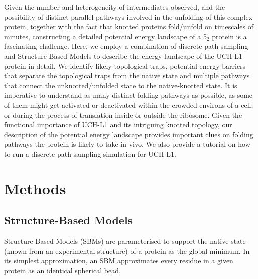 \documentclass[journal=jacsat]{achemso}
\begin{document}
Given the number and heterogeneity of intermediates observed, and the possibility of distinct parallel pathways involved in the unfolding of this complex protein, together with the fact that knotted proteins fold/unfold on timescales of minutes, constructing a detailed potential energy landscape of a 5$_2$ protein is a fascinating challenge. Here, we employ a combination of discrete path sampling\cite{DPS1} and Structure-Based Models\cite{Neelamraju20a,Neelamraju19a,Neelamraju18a,smog} to describe the energy landscape of the UCH-L1 protein in detail. We identify likely topological traps, potential energy barriers that separate the topological traps from the native state and multiple pathways that connect the unknotted/unfolded state to the native-knotted state. It is imperative to understand as many distinct folding pathways as possible, as some of them might get activated or deactivated within the crowded environs of a cell, or during the process of translation inside or outside the ribosome. Given the functional importance of UCH-L1 and its intriguing knotted topology, our description of the potential energy landscape provides important clues on folding pathways the protein is likely to take in vivo. We also provide a tutorial on how to run a discrete path sampling simulation for UCH-L1.


\section{Methods}
\subsection{Structure-Based Models}
Structure-Based Models (SBMs)\cite{smog} are parameterised to support the native state (known from an experimental structure) of a protein as the global minimum. In its simplest approximation, an SBM approximates every residue in a given protein as an identical spherical bead. 
\end{document}
